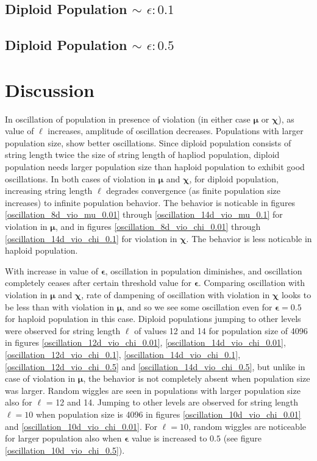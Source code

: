 \subsection{Diploid Population $\mathtt{\sim}$ $\epsilon: 0.1$}

\subsection{Diploid Population $\mathtt{\sim}$ $\epsilon: 0.5$}


\section{Discussion}

In oscillation of population in presence of violation (in either case $\bm{\mu}$ or $\bm{\chi}$), 
as value of $\ell$ increases, amplitude of oscillation decreases. 
Populations with larger population size, show better oscillations. 
Since diploid population consists of string length twice the size of string length of hapliod population, 
diploid population needs larger population size than haploid population to exhibit good oscillations. 
In both cases of violation in $\bm{\mu}$ and $\bm{\chi}$, for diploid population, increasing string length $\ell$ 
degrades convergence (as finite population size increases) to infinite population behavior. The behavior is noticable in figures 
\ref{oscillation_8d_vio_mu_0.01} through \ref{oscillation_14d_vio_mu_0.1} for violation in $\bm{\mu}$, 
and in figures \ref{oscillation_8d_vio_chi_0.01} through \ref{oscillation_14d_vio_chi_0.1} for violation in $\bm{\chi}$. 
The behavior is less noticable in haploid population.

With increase in value of $\bm{\epsilon}$, 
oscillation in population diminishes, and oscillation completely ceases after certain threshold value for $\bm{\epsilon}$. 
Comparing oscillation with violation in $\bm{\mu}$ and $\bm{\chi}$, rate of dampening of oscillation with violation 
in $\bm{\chi}$ looks to be less than with violation in ${\bm{\mu}}$, 
and so we see some oscillation even for $\bm{\epsilon} = 0.5$ for haploid population in this case. 
Diploid populations jumping to other levels 
were observed for string length $\ell$ of values 12 and 14 for population size of 4096 in 
figures \ref{oscillation_12d_vio_chi_0.01}, \ref{oscillation_14d_vio_chi_0.01}, \ref{oscillation_12d_vio_chi_0.1}, 
\ref{oscillation_14d_vio_chi_0.1}, \ref{oscillation_12d_vio_chi_0.5} and \ref{oscillation_14d_vio_chi_0.5}, 
but unlike in case of violation in $\bm{\mu}$, the behavior is not completely absent when population size was larger. 
Random wiggles are seen in populations with larger population size also for $\ell$ = 12 and 14. 
Jumping to other levels are observed for string length $\ell = 10$ when population size is 4096 in figures \ref{oscillation_10d_vio_chi_0.01} 
and \ref{oscillation_10d_vio_chi_0.01}.
For $\ell = 10$, random wiggles are 
noticeable for larger population also when $\bm{\epsilon}$ value is increased to $0.5$ (see figure \ref{oscillation_10d_vio_chi_0.5}).


